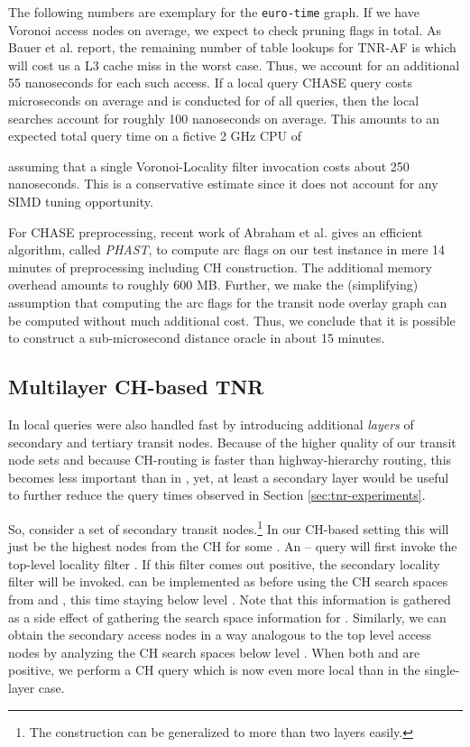 \documentclass{llncs}
\newcommand{\etal}{et al.\xspace}
\begin{document}
The following numbers are exemplary for the \texttt{euro-time} graph.
If we have  Voronoi access nodes on average, we expect to check  pruning flags in total.
As Bauer \etal report, the remaining number of table lookups for TNR-AF is  which will cost us a L3 cache miss in the worst case.
Thus, we account for an additional 55 nanoseconds for each such access.
If a local query CHASE query costs  microseconds on average \cite{dgnw-phast-12} and is conducted for  of all queries, then the local searches account for roughly 100 nanoseconds on average.
This amounts to an expected total query time on a fictive 2 GHz CPU of

assuming that a single Voronoi-Locality filter invocation costs about 250 nanoseconds.
This is a conservative estimate since it does not account for any SIMD tuning opportunity.

For CHASE preprocessing, recent work of Abraham \etal \cite{dgnw-phast-12} gives an efficient algorithm, called \emph{PHAST}, to compute arc flags on our test instance in mere 14 minutes of preprocessing including CH construction.
The additional memory overhead amounts to roughly 600 MB.
Further, we make the (simplifying) assumption that computing the arc flags for the transit node overlay graph can be computed without much additional cost.
Thus, we conclude that it is possible to construct a sub-microsecond distance oracle in about 15 minutes.

\subsection{Multilayer CH-based TNR}

In \cite{bfmss-itcsp-07,s-rprn-08} local queries were also handled fast by introducing additional \emph{layers} of secondary and tertiary transit nodes. Because of the higher quality of our transit node sets and because CH-routing is faster than highway-hierarchy routing, this becomes less important than in \cite{bfmss-itcsp-07}, yet, at least a secondary layer would be useful to further reduce the query times observed in Section \ref{sec:tnr-experiments}.

So, consider a set  of secondary transit nodes.\footnote{The construction can be generalized to more than two layers easily.} 
In our CH-based setting this will just be the highest  nodes from the CH for some .
An -- query will first invoke the top-level locality filter . If this filter comes out positive, the secondary locality filter  will be invoked.
 can be implemented as before using the CH search spaces from  and , this time staying below level . Note that this information is gathered as a side effect of gathering the search space information for .
Similarly, we can obtain the secondary access nodes in a way analogous to the
top level access nodes by analyzing the CH search spaces below level .
When both  and  are positive, we perform a CH query which 
is now even more local than in the single-layer case.
\end{document}
